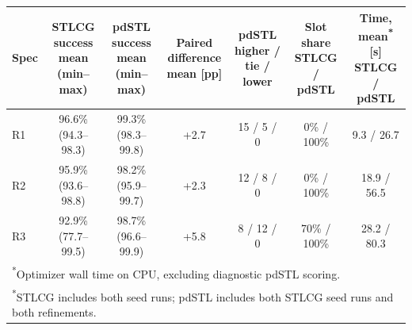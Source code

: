 \begin{tabular}{lcccccc}
\toprule
Spec & \shortstack{STLCG success\\mean (min--max)} & \shortstack{pdSTL success\\mean (min--max)} & \shortstack{Paired difference\\mean [pp]} & \shortstack{pdSTL\\higher / tie / lower} & \shortstack{Slot share\\STLCG / pdSTL} & \shortstack{Time, mean\textsuperscript{*} [s]\\STLCG / pdSTL} \\
\midrule
R1 & 96.6\% (94.3--98.3) & 99.3\% (98.3--99.8) & +2.7 & 15 / 5 / 0 & 0\% / 100\% & 9.3 / 26.7 \\
R2 & 95.9\% (93.6--98.8) & 98.2\% (95.9--99.7) & +2.3 & 12 / 8 / 0 & 0\% / 100\% & 18.9 / 56.5 \\
R3 & 92.9\% (77.7--99.5) & 98.7\% (96.6--99.9) & +5.8 & 8 / 12 / 0 & 70\% / 100\% & 28.2 / 80.3 \\
\bottomrule
\multicolumn{7}{l}{\footnotesize\textsuperscript{*}Optimizer wall time on CPU, excluding diagnostic pdSTL scoring.} \\
\multicolumn{7}{l}{\footnotesize\textsuperscript{*}STLCG includes both seed runs; pdSTL includes both STLCG seed runs and both refinements.} \\
\end{tabular}
